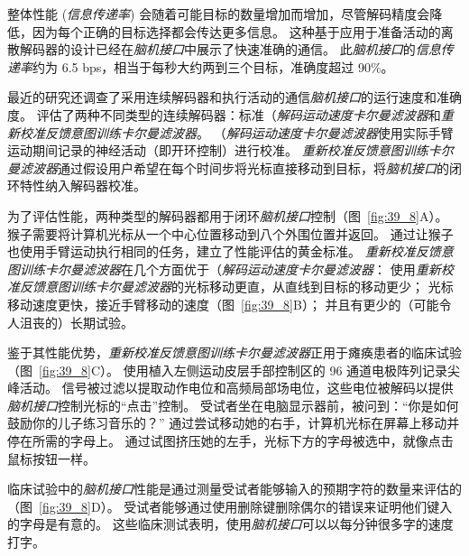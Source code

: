 整体性能 (\textit{信息传递率}) 会随着可能目标的数量增加而增加，尽管解码精度会降低，因为每个正确的目标选择都会传达更多信息。
这种基于应用于准备活动的离散解码器的设计已经在\textit{脑机接口}中展示了快速准确的通信。
此\textit{脑机接口}的\textit{信息传递率}约为 6.5 bps，相当于每秒大约两到三个目标，准确度超过 90\%。


最近的研究还调查了采用连续解码器和执行活动的通信\textit{脑机接口}的运行速度和准确度。
评估了两种不同类型的连续解码器：标准（\textit{解码运动速度卡尔曼滤波器}和\textit{重新校准反馈意图训练卡尔曼滤波器}。
（\textit{解码运动速度卡尔曼滤波器}使用实际手臂运动期间记录的神经活动（即开环控制）进行校准。
\textit{重新校准反馈意图训练卡尔曼滤波器}通过假设用户希望在每个时间步将光标直接移动到目标，将\textit{脑机接口}的闭环特性纳入解码器校准。


为了评估性能，两种类型的解码器都用于闭环\textit{脑机接口}控制（图~\ref{fig:39_8}A）。
猴子需要将计算机光标从一个中心位置移动到八个外围位置并返回。
通过让猴子也使用手臂运动执行相同的任务，建立了性能评估的黄金标准。
\textit{重新校准反馈意图训练卡尔曼滤波器}在几个方面优于（\textit{解码运动速度卡尔曼滤波器}：
使用\textit{重新校准反馈意图训练卡尔曼滤波器}的光标移动更直，从直线到目标的移动更少； 光标移动速度更快，接近手臂移动的速度（图~\ref{fig:39_8}B）； 并且有更少的（可能令人沮丧的）长期试验。


鉴于其性能优势，\textit{重新校准反馈意图训练卡尔曼滤波器}正用于瘫痪患者的临床试验（图~\ref{fig:39_8}C）。
使用植入左侧运动皮层手部控制区的 96 通道电极阵列记录尖峰活动。
信号被过滤以提取动作电位和高频局部场电位，这些电位被解码以提供\textit{脑机接口}控制光标的“点击”控制。
受试者坐在电脑显示器前，被问到：“你是如何鼓励你的儿子练习音乐的？” 通过尝试移动她的右手，计算机光标在屏幕上移动并停在所需的字母上。
通过试图挤压她的左手，光标下方的字母被选中，就像点击鼠标按钮一样。


临床试验中的\textit{脑机接口}性能是通过测量受试者能够输入的预期字符的数量来评估的（图~\ref{fig:39_8}D）。
受试者能够通过使用删除键删除偶尔的错误来证明他们键入的字母是有意的。
这些临床测试表明，使用\textit{脑机接口}可以以每分钟很多字的速度打字。


